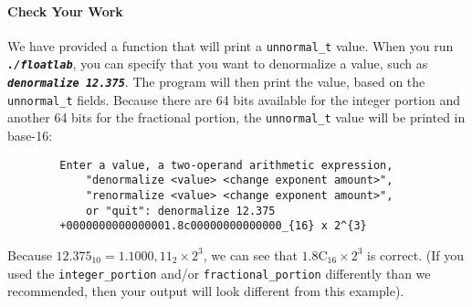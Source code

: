     \paragraph*{Check Your Work}

    We have provided a function that will print a \lstinline{unnormal_t} value.
    When you run \texttt{\textbf{\textit{./floatlab}}}, you can specify that you want to denormalize a value, such as \texttt{\textbf{\textit{denormalize 12.375}}}.
    The program will then print the value, based on the \lstinline{unnormal_t} fields.
    Because there are 64 bits available for the integer portion and another 64 bits for the fractional portion, the \lstinline{unnormal_t} value will be printed in base-16:

    \begin{verbatim}
        Enter a value, a two-operand arithmetic expression,
            "denormalize <value> <change exponent amount>",
            "renormalize <value> <change exponent amount>",
            or "quit": denormalize 12.375
        +0000000000000001.8c00000000000000_{16} x 2^{3}
    \end{verbatim}

    Because $12.375_{10} = 1.1000,11_{2} \times 2^3$, we can see that $1.8\mathrm{C}_{16} \times 2^3$ is correct.
    (If you used the \lstinline{integer_portion} and/or \lstinline{fractional_portion} differently than we recommended, then your output will look different from this example).